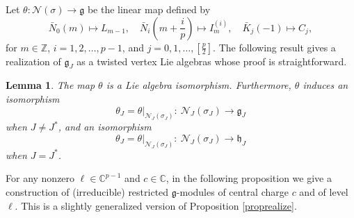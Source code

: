 \documentclass[12pt, reqno]{amsart}
\numberwithin{equation}{section}
\newtheorem{lemma}[theorem]{Lemma}%
\numberwithin{equation}{section}
\def\h{\mathfrak{h}}
\def\g{\mathfrak{g}}
\newcommand{\C}{\mathbb C}
\newcommand{\Z}{\mathbb{Z}}
\newcommand{\CN}{\mathcal{N}}
\begin{document}
Let $\theta: \CN(\sigma)\rightarrow \g$ be the linear map defined by
\[
\bar{N}_0(m)\mapsto L_{m-1},\quad \bar{N}_i(m+\frac{i}{p})\mapsto I_{m}^{(i)},\quad
\bar{K}_j(-1)\mapsto C_j,
\]
for $m\in \Z$, $i=1,2,\dots,p-1$, and $j=0,1,\dots,[\frac{p}{2}]$.
The following result gives a realization of $\g_J$ as a twisted vertex Lie algebras whose proof is straightforward.

\begin{lemma}\label{LAiso}
The map $\theta$ is a Lie algebra isomorphism. Furthermore,
 $\theta$ induces an isomorphism
\[
\theta_J=\theta|_{\CN_J(\sigma_J)}:\ \CN_J(\sigma_J)\rightarrow \g_J\]
when $J\ne J^*$, and an isomorphism
\[
\theta_J=\theta|_{\CN_J(\sigma_J)}:\ \CN_J(\sigma_J)\rightarrow \h_J\]
when $J=J^*$.
\end{lemma}

For any nonzero $\bm{\ell}\in\C^{p-1}$ and $c\in \C$, in the following proposition we give a construction of (irreducible) restricted $\g$-modules of central charge $c$ and of level $\bm{\ell}$.
This is a slightly generalized version of Proposition \ref{proprealize}.
\end{document}
